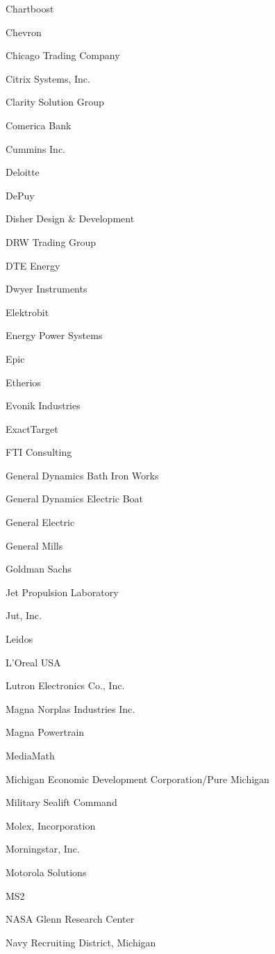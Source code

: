 \documentclass[twoside]{article}
\begin{document}
\begin{center}
\begin{multicols}{5}
\begin{FlushLeft}
\begin{compactitem}
\item Chartboost
\item Chevron
\item Chicago Trading Company
\item Citrix Systems, Inc.
\item Clarity Solution Group
\item Comerica Bank
\item Cummins Inc.
\item Deloitte
\item DePuy
\item Disher Design \& Development
\item DRW Trading Group
\item DTE Energy
\item Dwyer Instruments
\item Elektrobit
\item Energy Power Systems
\item Epic
\item Etherios
\item Evonik Industries
\item ExactTarget
\item FTI Consulting
\item General Dynamics Bath Iron Works
\item General Dynamics Electric Boat
\item General Electric
\item General Mills
\item Goldman Sachs
\item Jet Propulsion Laboratory
\item Jut, Inc.
\item Leidos
\item L'Oreal USA
\item Lutron Electronics Co., Inc.
\item Magna Norplas Industries Inc.
\item Magna Powertrain
\item MediaMath
\item Michigan Economic Development Corporation/Pure Michigan
\item Military Sealift Command
\item Molex, Incorporation
\item Morningstar, Inc.
\item Motorola Solutions
\item MS2
\item NASA Glenn Research Center
\item Navy Recruiting District, Michigan

\end{compactitem}
\end{FlushLeft}
\end{multicols}
\end{center}
\end{document}
